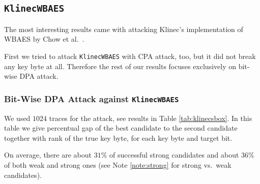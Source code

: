 
\subsection{\tt KlinecWBAES}
\label{sec:klinecwbaes}

The most interesting results came with attacking Klinec's implementation \cite{klinec2013implementation} of WBAES by Chow et al.\ \cite{chow2002aes}.

First we tried to attack {\tt KlinecWBAES} with CPA attack, too, but it did not break any key byte at all. Therefore the rest of our results focuses exclusively on bit-wise DPA attack.

\subsubsection{Bit-Wise DPA Attack against {\tt KlinecWBAES}}
	
	We used $1024$ traces for the attack, see results in Table \ref{tab:klinecsbox}. In this table we give percentual gap of the best candidate to the second candidate together with rank of the true key byte, for each key byte and target bit.
	
	
	On average, there are about $31\%$ of successful strong candidates and about $36\%$ of both weak and strong ones (see Note \ref{note:strong} for strong vs.\ weak candidates).
	
